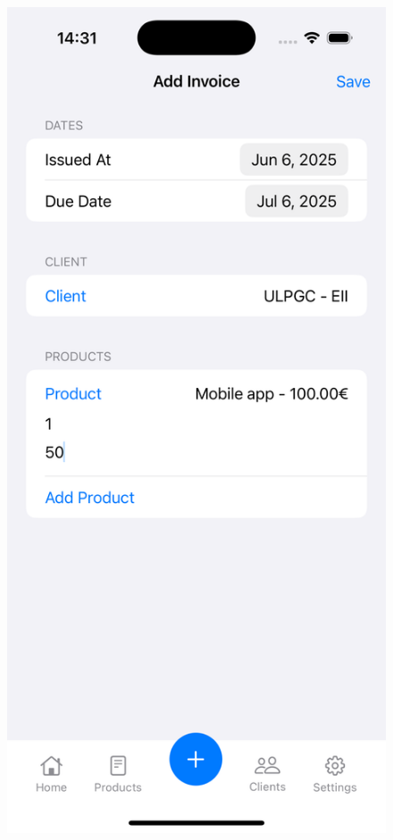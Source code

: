 \begin{large}
\begin{figure}[H]
	\centering
  \begin{minipage}[t]{0.45\textwidth}
    \centering
    \includegraphics[width=\linewidth]{Ilustraciones/ios_addinvoice.png}

\end{minipage}
\end{figure}
\end{large}
